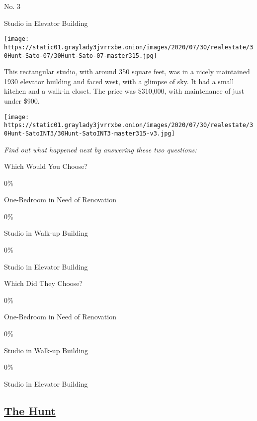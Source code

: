 No. 3

Studio in Elevator Building

\texttt{[image: https://static01.graylady3jvrrxbe.onion/images/2020/07/30/realestate/30Hunt-Sato-07/30Hunt-Sato-07-master315.jpg]}

This rectangular studio, with around 350 square feet, was in a nicely
maintained 1930 elevator building and faced west, with a glimpse of sky.
It had a small kitchen and a walk-in closet. The price was \$310,000,
with maintenance of just under \$900.

\texttt{[image: https://static01.graylady3jvrrxbe.onion/images/2020/07/30/realestate/30Hunt-SatoINT3/30Hunt-SatoINT3-master315-v3.jpg]}

\emph{Find out what happened next by answering these two questions:}

Which Would You Choose?

0\%

One-Bedroom in Need of Renovation

0\%

Studio in Walk-up Building

0\%

Studio in Elevator Building

Which Did They Choose?

0\%

One-Bedroom in Need of Renovation

0\%

Studio in Walk-up Building

0\%

Studio in Elevator Building

\hypertarget{the-hunt}{%
\subsection{\texorpdfstring{\href{https://www.nytimes3xbfgragh.onion/column/the-hunt}{The
Hunt}}{The Hunt}}\label{the-hunt}}

